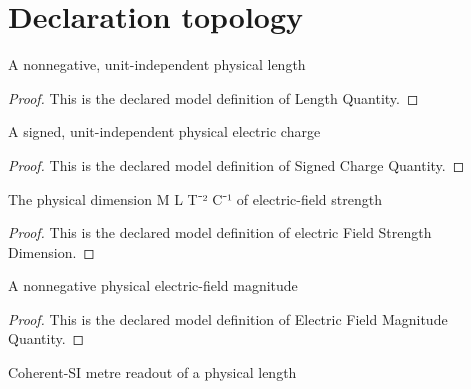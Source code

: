 \section{Declaration topology}
\begin{definition}
  \label{def:physics:phyx-mini-0994:phyxminiproblems-problemphyxmini0994-lengthquantity}
  A nonnegative, unit-independent physical length
\end{definition}
\begin{proof}
  This is the declared model definition of Length Quantity.
\end{proof}
\begin{definition}
  \label{def:physics:phyx-mini-0994:phyxminiproblems-problemphyxmini0994-signedchargequantity}
  A signed, unit-independent physical electric charge
\end{definition}
\begin{proof}
  This is the declared model definition of Signed Charge Quantity.
\end{proof}
\begin{definition}
  \label{def:physics:phyx-mini-0994:phyxminiproblems-problemphyxmini0994-electricfieldstrengthdimension}
  The physical dimension M L T⁻² C⁻¹ of electric-field strength
\end{definition}
\begin{proof}
  This is the declared model definition of electric Field Strength Dimension.
\end{proof}
\begin{definition}
  \label{def:physics:phyx-mini-0994:phyxminiproblems-problemphyxmini0994-electricfieldmagnitudequantity}
  A nonnegative physical electric-field magnitude
\end{definition}
\begin{proof}
  This is the declared model definition of Electric Field Magnitude Quantity.
\end{proof}
\begin{definition}
  \label{def:physics:phyx-mini-0994:phyxminiproblems-problemphyxmini0994-lengthinmeters}
  Coherent-SI metre readout of a physical length
\end{definition}
